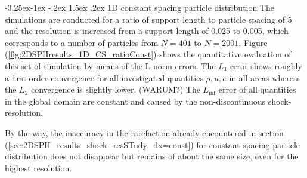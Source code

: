 \documentclass{report}
\makeatletter
\renewcommand\paragraph{\@startsection{paragraph}{4}{\z@}%
  {-3.25ex\@plus -1ex \@minus -.2ex}%
  {1.5ex \@plus .2ex}%
  {\normalfont\normalsize\bfseries}}
\makeatother
\begin{document}
\paragraph{1D constant spacing particle distribution}
The simulations are conducted for a ratio of support length to particle spacing of 5 and the resolution is increased from a support length of 0.025 to 0.005, which corresponds to a number of particles from $N=401$ to $N=2001$. 
Figure (\ref{fig:2DSPHresults_1D_CS_ratioConst}) shows the quantitative evaluation of this set of simulation by means of the L-norm errors. The $L_1$ error shows roughly a first order convergence for all investigated quantities $\rho, u, e$ in all areas whereas the $L_2$ convergence is slightly lower.  (WARUM?)
The $L_{\inf}$ error of all quantities in the global domain are constant and caused by the non-discontinuous shock-resolution.

By the way, the inaccuracy in the rarefaction already encountered in section (\ref{sec:2DSPH_results_shock_resSTudy_dx=const}) for constant spacing particle distribution does not disappear but remains of about the same size, even for the highest resolution. 

\end{document}
